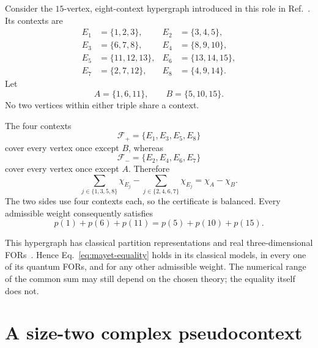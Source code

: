 \documentclass[
  twocolumn,
  aps,
  pra,
  floatfix,
  amsmath,amssymb,
  longbibliography
]{revtex4-2}
\theoremstyle{definition}
\theoremstyle{remark}
\begin{document}
Consider the $15$-vertex, eight-context hypergraph introduced in this role in
Ref.~\cite{2023-navara-svozil}.  Its contexts are
\begin{align}
 E_1&=\{1,2,3\},& E_2&=\{3,4,5\},\nonumber\\
 E_3&=\{6,7,8\},& E_4&=\{8,9,10\},\nonumber\\
 E_5&=\{11,12,13\},& E_6&=\{13,14,15\},\label{eq:mayet-edges}\\
 E_7&=\{2,7,12\},& E_8&=\{4,9,14\}.\nonumber
\end{align}
Let
\begin{equation}
 A=\{1,6,11\},\qquad B=\{5,10,15\}.
 \label{eq:mayet-targets}
\end{equation}
No two vertices within either triple share a context.

The four contexts
\begin{equation}
 \mathcal F_+=\{E_1,E_3,E_5,E_8\}
 \label{eq:cover-plus}
\end{equation}
cover every vertex once except $B$, whereas
\begin{equation}
 \mathcal F_-=\{E_2,E_4,E_6,E_7\}
 \label{eq:cover-minus}
\end{equation}
cover every vertex once except $A$.  Therefore
\begin{equation}
 \sum_{j\in\{1,3,5,8\}}\chi_{E_j}
 -\sum_{j\in\{2,4,6,7\}}\chi_{E_j}
 =\chi_A-\chi_B.
 \label{eq:mayet-certificate}
\end{equation}
The two sides use four contexts each, so the certificate is balanced.  Every
admissible weight consequently satisfies
\begin{equation}
 p(1)+p(6)+p(11)=p(5)+p(10)+p(15).
 \label{eq:mayet-equality}
\end{equation}

This hypergraph has classical partition representations and real
three-dimensional FORs~\cite{2023-navara-svozil}.  Hence
Eq.~\eqref{eq:mayet-equality} holds in its classical models, in every one of
its quantum FORs, and for any other admissible weight.
The numerical range of the common sum may still depend on the chosen theory;
the equality itself does not.

\section{A size-two complex pseudocontext}
\label{sec:octagon}
\end{document}
